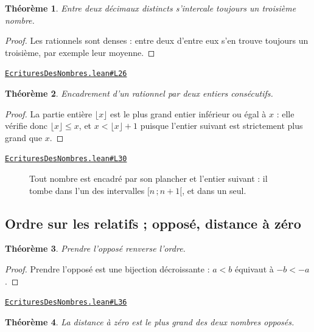\documentclass[11pt,a4paper]{article}
\theoremstyle{definition}
\theoremstyle{plain}
\newtheorem{theoreme}{Théorème}
\newcommand{\source}[2]{\par\smallskip\noindent\hfill{\footnotesize\href{#1}{\texttt{#2}}}\par\smallskip}
\begin{document}
\begin{theoreme}
Entre deux décimaux distincts s'intercale toujours un troisième nombre.
\end{theoreme}

\begin{proof}
Les rationnels sont denses : entre deux d'entre eux s'en trouve toujours un
troisième, par exemple leur moyenne.
\end{proof}
\source{https://github.com/Commutator-IO/learn-lean/blob/main/courses/01-college/01-nombres-et-calculs/EcrituresDesNombres.lean\#L26}{EcrituresDesNombres.lean\#L26}

\begin{theoreme}
Encadrement d'un rationnel par deux entiers consécutifs.
\end{theoreme}

\begin{proof}
La partie entière $\lfloor x \rfloor$ est le plus grand entier inférieur ou égal à
$x$ : elle vérifie donc $\lfloor x \rfloor \le x$, et $x < \lfloor x \rfloor + 1$ puisque
l'entier suivant est strictement plus grand que $x$.
\end{proof}
\source{https://github.com/Commutator-IO/learn-lean/blob/main/courses/01-college/01-nombres-et-calculs/EcrituresDesNombres.lean\#L30}{EcrituresDesNombres.lean\#L30}

\begin{figure}[h]
\centering

\caption{Tout nombre est encadré par son plancher et l'entier suivant : il tombe dans l'un des intervalles $[n\,;n+1[$, et dans un seul.}
\end{figure}

\subsection{Ordre sur les relatifs ; opposé, distance à zéro}

\begin{theoreme}
Prendre l'opposé renverse l'ordre.
\end{theoreme}

\begin{proof}
Prendre l'opposé est une bijection décroissante : $a < b$ équivaut à $-b < -a$.
\end{proof}
\source{https://github.com/Commutator-IO/learn-lean/blob/main/courses/01-college/01-nombres-et-calculs/EcrituresDesNombres.lean\#L36}{EcrituresDesNombres.lean\#L36}

\begin{theoreme}
La distance à zéro est le plus grand des deux nombres opposés.
\end{theoreme}
\end{document}
